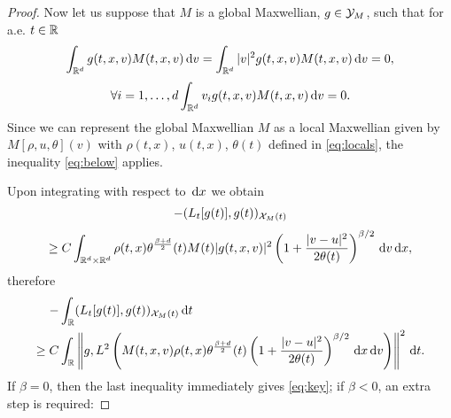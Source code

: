 \begin{proof}
Now let us suppose that $M$ is a global Maxwellian, $g\in {\mathcal Y_M}$, such that for a.e. $t\in {\mathbb R}$
\[\int_{\mathbb R^d} g(t,x,v) M(t,x,v){\,\mathrm{d} v} =  \int_{\mathbb R^d}|v|^2 g(t,x,v) M(t,x,v){\,\mathrm{d} v}=0,\]\[ \forall i=1,\dots , d \int _{\mathbb R^d} v_i  g(t,x,v) M(t,x,v){\,\mathrm{d} v}=0.\]
Since we can represent the global Maxwellian $M$ as a local Maxwellian given by $  M [{\rho,u,\theta}](v)$ with $\rho(t,x)$, $u(t,x)$, $\theta(t)$ defined in \eqref{eq:locals}, the inequality \eqref{eq:below} applies. 

Upon integrating with respect to ${\,\mathrm{d} x}$ we obtain 
	\[-(L_t[g(t)],g(t))_{{\mathcal X_M(t)}}\]\[\ge C \int_{{\mathbb R^d}\times{\mathbb R^d}} \rho(t,x)\theta^{\frac{\beta+d}{2}}	(t)  M(t)|g(t,x,v)|^2 \left(1+\frac{|v-u|^2}{2 \theta(t)}\right)^{\beta/2}{\,\mathrm{d} v}{\,\mathrm{d} x},\]
therefore
\begin{equation}\label{eq:prekey}\begin{aligned}
		-\int_{{\mathbb R}}&(L_t[g(t)],g(t))_{{\mathcal X_M(t)}}{\,\mathrm dt}\\ \ge C \int_{{\mathbb R}}&\left\|g,L^2\left(M(t,x,v)\rho(t,x)\theta^{\frac{\beta+d}{2}}	(t)\left(1+\frac{|v-u|^2}{2 \theta(t)}\right)^{\beta/2}{\,\mathrm{d} x}{\,\mathrm{d} v} \right)\right\|^2{\,\mathrm dt}. 
\end{aligned}
\end{equation}
If $\beta=0$, then the last inequality immediately gives \eqref{eq:key}; if $\beta<0$, an extra step is required:


\end{proof}
